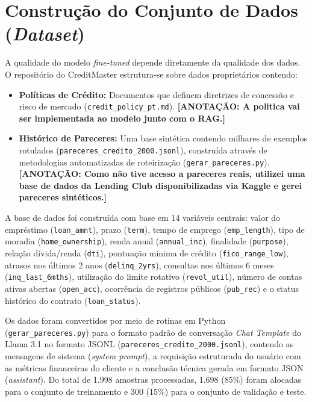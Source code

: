 \section{Construção do Conjunto de Dados (\textit{Dataset})}
A qualidade do modelo \textit{fine-tuned} depende diretamente da qualidade dos dados. O repositório do CreditMaster estrutura-se sobre dados proprietários contendo:
\begin{itemize}
    \item \textbf{Políticas de Crédito:} Documentos que definem diretrizes de concessão e risco de mercado (\texttt{credit\_policy\_pt.md}). \textbf{[ANOTAÇÃO: A politica vai ser implementada ao modelo junto com o RAG.]}
    \item \textbf{Histórico de Pareceres:} Uma base sintética contendo milhares de exemplos rotulados (\texttt{pareceres\_credito\_2000.jsonl}), construída através de metodologias automatizadas de roteirização (\texttt{gerar\_pareceres.py}). \textbf{[ANOTAÇÃO: Como não tive acesso a pareceres reais, utilizei uma base de dados da Lending Club disponibilizadas via Kaggle e gerei pareceres sintéticos.]}
\end{itemize}
A base de dados foi construída com base em 14 variáveis centrais: valor do empréstimo (\texttt{loan\_amnt}), prazo (\texttt{term}), tempo de emprego (\texttt{emp\_length}), tipo de moradia (\texttt{home\_ownership}), renda anual (\texttt{annual\_inc}), finalidade (\texttt{purpose}), relação dívida/renda (\texttt{dti}), pontuação mínima de crédito (\texttt{fico\_range\_low}), atrasos nos últimos 2 anos (\texttt{delinq\_2yrs}), consultas nos últimos 6 meses (\texttt{inq\_last\_6mths}), utilização do limite rotativo (\texttt{revol\_util}), número de contas ativas abertas (\texttt{open\_acc}), ocorrência de registros públicos (\texttt{pub\_rec}) e o status histórico do contrato (\texttt{loan\_status}).

Os dados foram convertidos por meio de rotinas em Python (\texttt{gerar\_pareceres.py}) para o formato padrão de conversação \textit{Chat Template} do Llama 3.1 no formato JSONL (\texttt{pareceres\_credito\_2000.jsonl}), contendo as mensagens de sistema (\textit{system prompt}), a requisição estruturada do usuário com as métricas financeiras do cliente e a conclusão técnica gerada em formato JSON (\textit{assistant}). Do total de 1.998 amostras processadas, 1.698 (85\%) foram alocadas para o conjunto de treinamento e 300 (15\%) para o conjunto de validação e teste.

